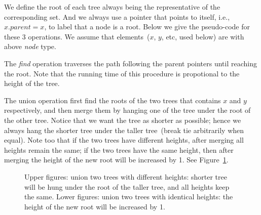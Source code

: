 We define the root of each tree always being the representative of the corresponding set.
And we always use a pointer that points to itself, i.e., $x.parent = x$, to label
that a node is a root.
Below we give the pseudo-code for these 3 operations.
We assume that elements~($x$, $y$, etc, used below) are with above \emph{node} type.

\begin{minipage}{0.8\textwidth}
	\xxx
	\xxx
	\xxx
	\xxx
\end{minipage}

The \emph{find} operation traverses the path following the parent pointers 
until reaching the root. Note that the running time of this procedure
is propotional to the height of the tree.

\begin{minipage}{0.8\textwidth}
	\xxx
	\xxx
	\xxx
	\xxx
	\xxx
	\xxx
\end{minipage}

The union operation first find the roots of the two trees that contains $x$ and
$y$ respectively, and then merge them by hanging one of the tree under the root
of the other tree. Notice that we want the tree as shorter as possible;
hence we always hang the shorter tree under the taller tree~(break tie arbitrarily when equal).
Note too that if the two trees have different heights,
after merging all heights remain the same;
if the two trees have the same height, then after merging
the height of the new root will be increased by 1.
See Figure~\ref{fig:union}.

\begin{minipage}{0.8\textwidth}
	\xxx
	\xxx
	\xxx
	\xxx
	\xxx
	\xxx
	\xxx
	\xxx
	\xxx
	\xxx
	\xxx
	\xxx
	\xxx
\end{minipage}


\begin{figure}[h]
\centering{}
\vspace*{0.4cm}
\centering{}
\caption{Upper figures: union two trees with different heights: shorter tree will
be hung under the root of the taller tree, and all heights keep the same.
Lower figures: union two trees with identical heights: the height of 
	the new root will be increased by 1.}
\label{fig:union}
\end{figure}

